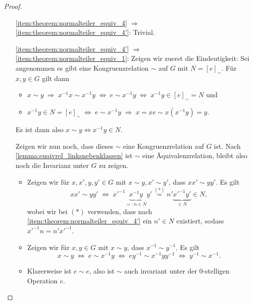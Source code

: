 \begin{proof}{\ }
\begin{itemize}[topsep=0cm, leftmargin=2.2cm]
        \item[\ref*{item:theorem:normalteiler_equiv_4} $\Rightarrow$ \ref*{item:theorem:normalteiler_equiv_4'}:] 
        Trivial.
        
        \item[\ref*{item:theorem:normalteiler_equiv_4'} $\Rightarrow$ \ref*{item:theorem:normalteiler_equiv_1}:]  
        Zeigen wir zuerst die Eindeutigkeit: Sei angenommen es gibt eine Kongruenzrelation $\sim$ auf $G$ mit $N = [e]_\sim$. Für $x, y\in G$ gilt dann 
        \begin{itemize}
            \item $x \sim y \;\Rightarrow\; x^{-1}x \sim x^{-1}y \; \Leftrightarrow\; e \sim x^{-1}y \;\Leftrightarrow\; x^{-1}y \in [e]_\sim = N$ und
            \item $x^{-1}y \in N = [e]_\sim \;\Leftrightarrow\; e \sim x^{-1}y \;\Rightarrow\; x = xe \sim x(x^{-1}y) = y$.
        \end{itemize}
        Es ist dann also $x \sim y \Leftrightarrow x^{-1}y \in N$. 
        
        Zeigen wir nun noch, dass dieses $\sim$ eine Kongruenzrelation auf $G$ ist. Nach \cref{lemma:euqivrel_linksnebenklassen} ist $\sim$ eine Äquivalenzrelation, bleibt also noch die Invarianz unter $G$ zu zeigen. 
        \begin{itemize}
            \item Zeigen wir für $x,x',y,y' \in G$ mit $x \sim y, x' \sim y'$, dass $xx'\sim yy'$. Es gilt 
            $$ xx'\sim yy' \;\Leftrightarrow\; x'^{-1}\underbrace{x^{-1}y}_{=: n \in N} y' \overset{(*)}{=} n'\underbrace{x'^{-1}y'}_{\in N} \in N, $$
            wobei wir bei $(*)$ verwenden, dass nach \ref*{item:theorem:normalteiler_equiv_4'} ein $n' \in N$ existiert, sodass $x'^{-1} n = n' x'^{-1}$.
            \item Zeigen wir für $x,y \in G$ mit $x \sim y$, dass $x^{-1} \sim y^{-1}$. Es gilt
            $$ x\sim y \;\Leftrightarrow\; e \sim x^{-1}y \;\Leftrightarrow\; ey^{-1} \sim x^{-1} y y^{-1} \;\Leftrightarrow\; y^{-1} \sim x^{-1}.$$ 
            \item Klarerweise ist $e \sim e$, also ist $\sim$ auch invariant unter der 0-stelligen Operation $e$.
        \end{itemize}
    \end{itemize}
\end{proof}

